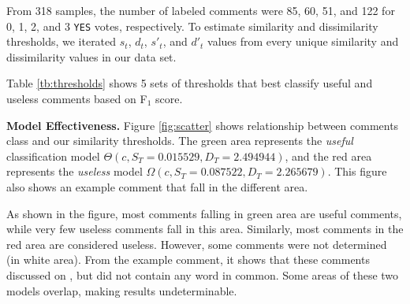 
%

From 318 samples, the number of labeled comments were 85, 60, 51, and 122 for 0, 1, 2, and 3 \texttt{YES} votes, respectively.
To estimate similarity and dissimilarity thresholds, we iterated $s_t$, $d_t$, $s'_t$, and $d'_t$ values from every unique similarity and dissimilarity values in our data set.
  
Table \ref{tb:thresholds} shows 5 sets of thresholds that best classify useful and useless comments based on F$_1$ score.

\textbf{Model Effectiveness.}
Figure \ref{fig:scatter} shows relationship between comments class and our similarity thresholds.
The green area represents the \emph{useful} classification model $\Theta(c,S_T=0.015529,D_T=2.494944)$, and the red area represents the \emph{useless} model $\Omega(c,S_T=0.087522,D_T=2.265679)$.
This figure also shows an example comment that fall in the different area.

As shown in the figure, most comments falling in green area are useful comments, while very few useless comments fall in this area.
Similarly, most comments in the red area are considered useless.
However, some comments were not determined (in white area).
From the example comment, it shows that these comments discussed on , but did not contain any word in common.
Some areas of these two models overlap, making results undeterminable.

